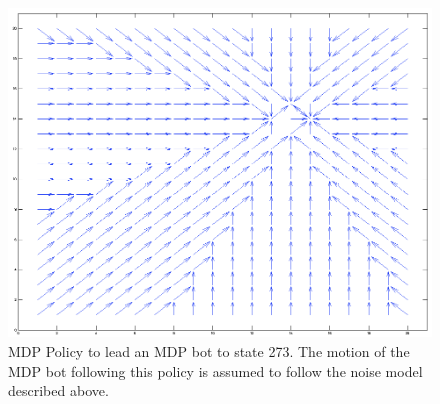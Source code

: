 \documentclass{aiaa-tc}%
\begin{document}
\begin{figure}[htbp]
   \centering
   \includegraphics[width=170mm]{static_policy_noisy_to_state_273.png} 
   \caption{MDP Policy to lead an MDP bot to state 273. The motion of the MDP bot following this policy is assumed to follow the noise model described above.}
   \label{fig:sample}
\end{figure}
\clearpage
\end{document}
